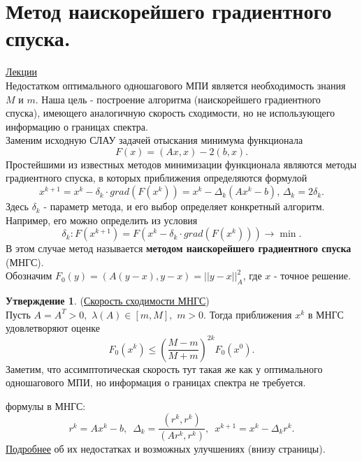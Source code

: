 \documentclass[specialist, subf, href, colorlinks=true, 12pt, times, mtpro, final]{disser}
\theoremstyle{definition}
\newtheorem{state}{Утверждение}[section]
\begin{document}
{\section {Метод наискорейшего градиентного спуска.}
    \hyperlink {lects.68}{Лекции}\\
    Недостатком оптимального одношагового МПИ является необходимость знания $M$ и $m$.
    Наша цель - построение алгоритма (наискорейшего градиентного спуска), имеющего
    аналогичную скорость сходимости, но не использующего информацию о границах спектра.\\
    Заменим исходную СЛАУ задачей отыскания минимума функционала
    $$
       F(x) = (Ax, x) - 2(b,x).
    $$
    Простейшими из известных методов минимизации функционала являются методы градиентного
    спуска, в которых приближения определяются формулой
    $$
        x^{k+1} = x^k - \delta_k\cdot grad(F(x^k)) = x^k - \Delta_k (Ax^k - b), \,
        \Delta_k = 2\delta_k.
    $$
    Здесь $\delta_k$ - параметр метода, и его выбор определяет конкретный алгоритм.
    Например, его можно определить из условия
    $$
        \delta_k: F(x^{k+1}) = F(x^k - \delta_k\cdot grad(F(x^k))) \rightarrow \min.
    $$
    В этом случае метод называется {\bf методом наискорейшего градиентного спуска} (МНГС).\\
    Обозначим $F_0(y) = (A(y-x), y-x) = ||y-x||_A^2$, где $x$ - точное решение.
    \begin{state} (\hyperlink {lects.69}{Скорость сходимости МНГС})\\
    Пусть $A = A^T > 0, \,\, \lambda(A) \in [m, M], \,\, m > 0$. Тогда приближения $x^k$
    в МНГС удовлетворяют оценке
    $$
        F_0(x^k) \le \left(\frac{M-m}{M+m}\right)^{2k}F_0(x^0).
    $$
    Заметим, что ассимптотическая скорость тут такая же как у оптимального одношагового МПИ,
    но информация о границах спектра не требуется.
    \end{state}
     формулы в МНГС:
    $$
        r^k = Ax^k - b,\,\,\, \Delta_k = \frac{(r^k, r^k)}{(Ar^k, r^k)}, \,\,\,
        x^{k+1} = x^k - \Delta_k r^{k}.
    $$
    \hyperlink {lects.70}{Подробнее} об их недостатках и возможных улучшениях
    (внизу страницы).

}
\end{document}
